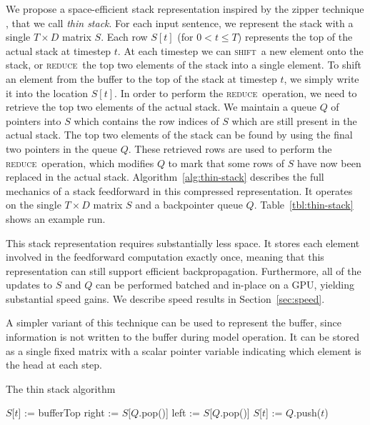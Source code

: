 \documentclass[11pt]{article}
\newcommand{\shift}{\textsc{shift}}
\newcommand{\reduce}{\textsc{reduce}}
\begin{document}
We propose a space-efficient stack representation inspired by the zipper technique \citep{huet1997zipper}, that we call \textit{thin stack}. For each input sentence, we represent the stack with a single $T \times D$ matrix $S$. Each row $S[t]$ (for $0<t\le T$) represents the top of the actual stack at timestep $t$. At each timestep we can \shift\ a new element onto the stack, or \reduce\ the top two elements of the stack into a single element. To shift an element from the buffer to the top of the stack at timestep $t$, we simply write it into the location $S[t]$. In order to perform the \reduce\ operation, we need to retrieve the top two elements of the actual stack. We maintain a queue $Q$ of pointers into $S$ which contains the row indices of $S$ which are still present in the actual stack. The top two elements of the stack can be found by using the final two pointers in the queue $Q$. These retrieved rows are used to perform the \reduce\ operation, which modifies $Q$ to mark that some rows of $S$ have now been replaced in the actual stack. Algorithm~\ref{alg:thin-stack} describes the full mechanics of a stack feedforward in this compressed representation. It operates on the single $T \times D$ matrix $S$ and a backpointer queue $Q$. Table~\ref{tbl:thin-stack} shows an example run.

This stack representation requires substantially less space. It stores each element involved in the feedforward computation exactly once, meaning that this representation can still support efficient backpropagation. Furthermore, all of the updates to $S$ and $Q$ can be performed batched and in-place on a GPU, yielding substantial speed gains. We describe speed results in Section~\ref{sec:speed}.

A simpler variant of this technique can be used to represent the buffer, since information is not written to the buffer during model operation. It can be stored as a single fixed matrix with a scalar pointer variable indicating which element is the head at each step.

\begin{algorithm}[t]
\caption{The thin stack algorithm}
\label{alg:thin-stack}
\begin{algorithmic}[1]
    \If{$a$ = \shift}
      \State $S$[$t$] := bufferTop
    \ElsIf{$a$ = \reduce}
      \State right := $S$[$Q$.pop()]
      \State left := $S$[$Q$.pop()]
      \State $S$[$t$] := 
    \EndIf
    \State $Q$.push($t$)
  \EndFunction
\end{algorithmic}
\end{algorithm}
\end{document}
